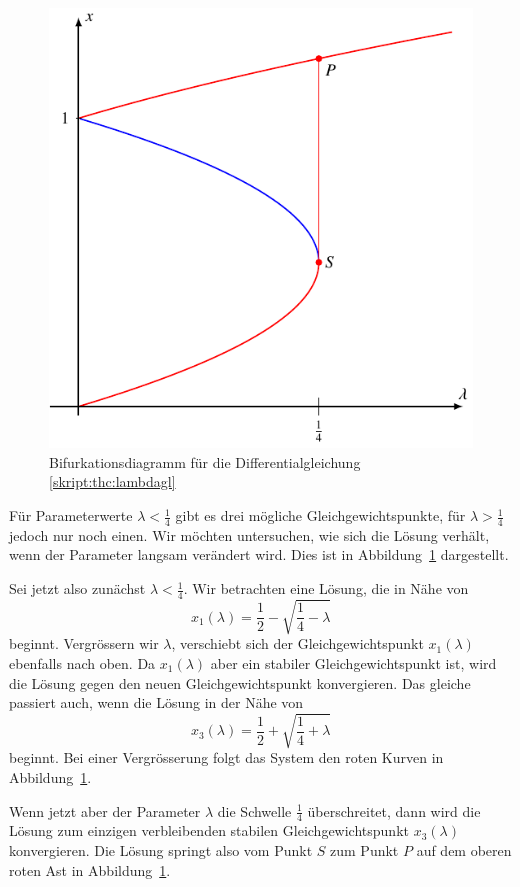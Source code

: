 \begin{figure}
\centering
\includegraphics{chapters/4/bi.pdf}
\caption{Bifurkationsdiagramm für die Differentialgleichung
\eqref{skript:thc:lambdagl}
\label{skript:thc:bifurkation}}
\end{figure}
Für Parameterwerte $\lambda < \frac14$ gibt es drei mögliche
Gleichgewichtspunkte, für $\lambda>\frac14$ jedoch nur noch einen.
Wir möchten untersuchen, wie sich die Lösung verhält, wenn der
Parameter langsam verändert wird.
Dies ist in Abbildung~\ref{skript:thc:bifurkation} dargestellt.

Sei jetzt also zunächst $\lambda <\frac14$.
Wir betrachten eine Lösung, die in Nähe von
\[
x_1(\lambda)=\frac12-\sqrt{\frac14-\lambda}
\]
beginnt.
Vergrössern wir $\lambda$, verschiebt sich der Gleichgewichtspunkt
$x_1(\lambda)$ ebenfalls nach oben.
Da $x_1(\lambda)$ aber ein stabiler Gleichgewichtspunkt ist, wird die
Lösung gegen den neuen Gleichgewichtspunkt konvergieren.
Das gleiche passiert auch, wenn die Lösung in der Nähe von
\[
x_3(\lambda)=\frac12+\sqrt{\frac14+\lambda}
\]
beginnt.
Bei einer Vergrösserung folgt das System den roten Kurven in
Abbildung~\ref{skript:thc:bifurkation}.

Wenn jetzt aber der Parameter $\lambda$ die Schwelle $\frac14$
überschreitet, dann wird die Lösung zum einzigen verbleibenden
stabilen Gleichgewichtspunkt $x_3(\lambda)$ konvergieren.
Die Lösung springt also vom Punkt $S$ zum Punkt $P$ auf dem oberen roten Ast
in Abbildung~\ref{skript:thc:bifurkation}.

